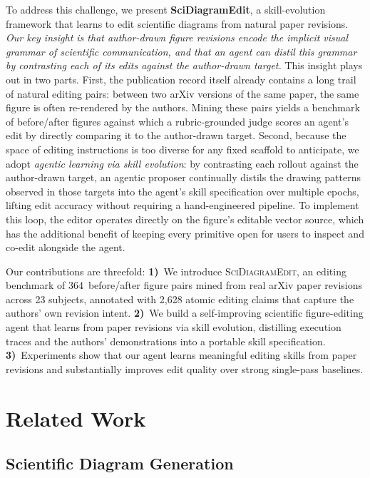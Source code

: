 \documentclass[11pt]{article}
\begin{document}
To address this challenge, we present \textbf{SciDiagramEdit}, a
skill-evolution framework that learns to edit scientific diagrams
from natural paper revisions.
\emph{Our key insight is that author-drawn figure revisions encode
the implicit visual grammar of scientific communication, and that
an agent can distil this grammar by contrasting each of its edits
against the author-drawn target.}  This insight plays
out in two parts.  First, the publication record itself already
contains a long trail of natural editing pairs: between two arXiv
versions of the same paper, the same figure is often re-rendered
by the authors.  Mining these pairs yields a benchmark of
before/after figures against which a rubric-grounded judge scores
an agent's edit by directly comparing it to the author-drawn
target.  Second, because the space of editing instructions is too
diverse for any fixed scaffold to anticipate, we adopt
\emph{agentic learning via skill evolution}: by contrasting each
rollout against the author-drawn target, an agentic proposer
continually distils the drawing patterns observed in those targets
into the agent's skill specification over multiple epochs, lifting
edit accuracy without requiring a hand-engineered pipeline.  To
implement this loop, the editor operates directly on the figure's
editable vector source, which has the additional benefit of keeping
every primitive open for users to inspect and co-edit alongside the
agent.

Our contributions are threefold:
\textbf{1)}~We introduce \textsc{SciDiagramEdit}, an editing
benchmark of 364~before/after figure pairs mined from real arXiv
paper revisions across 23 subjects, annotated with 2{,}628 atomic
editing claims that capture the authors' own revision intent.
\textbf{2)}~We build a self-improving scientific figure-editing
agent that learns from paper revisions via skill evolution,
distilling execution traces and the authors' demonstrations into
a portable skill specification.
\textbf{3)}~Experiments show that our agent learns meaningful
editing skills from paper revisions and substantially improves
edit quality over strong single-pass baselines.

\section{Related Work}
\label{sec:related}

\subsection{Scientific Diagram Generation}
\label{sec:rw-generation}
\end{document}
